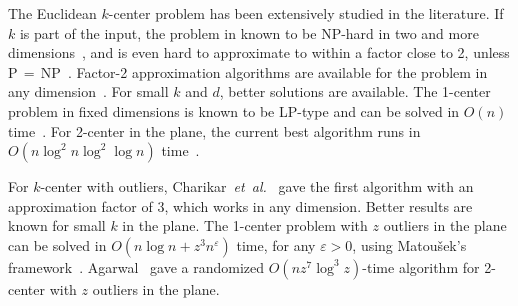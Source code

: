 \documentclass[envcountsame]{cls/cccg15}
\renewcommand{\O}{\ensuremath{{O}}}
\newcommand{\eps}{\varepsilon}
\newcommand{\etal}{{\em et~al.\/}}
\begin{document}

The Euclidean $k$-center problem has been extensively studied in the literature.
If $k$ is part of the input,
the problem in known to be NP-hard in two and more dimensions~\cite{fowler1981optimal},
and is even hard to approximate to within a factor close to 2, 
unless P$\,=\,$NP~\cite{feder1988optimal}.
Factor-2 approximation algorithms are available for the problem 
in any dimension~\cite{gonzalez1985clustering,feder1988optimal}.
For small $k$ and $d$, %
better solutions are available.
The 1-center problem in fixed dimensions is known to be LP-type 
and can be solved in $O(n)$ time~\cite{chazelle1996linear}.
For 2-center in the plane, the current best algorithm
runs in $\O(n \log^2 n \log^2 \log n)$ time~\cite{chan1999more}.


For $k$-center with outliers, Charikar~\etal~\cite{charikar2001algorithms} 
gave the first algorithm with an approximation factor of $3$, 
which works in any dimension.
Better results are known for small $k$ in the plane.
The 1-center problem with $z$ outliers in the plane can be solved 
in $\O(n \log n + z^{3} n^{\eps})$ time, for any $\eps > 0$, 
using Matou{\v{s}}ek's framework~\cite{matouvsek1995geometric}.
Agarwal~\cite{agarwal2008efficient} gave a randomized 
$\O(n z^{7} \log^3 z)$-time algorithm for 2-center with $z$ outliers in the plane.
\end{document}
